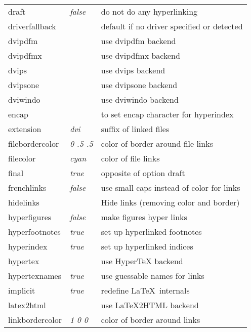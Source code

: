 \documentclass{article}
\begin{document}
\begin{longtable}{@{}>{\ttfamily}llp{7cm}@{}}
draft              & \textit{false}         & do not do any hyperlinking \\
driverfallback     &                        & default if no driver specified or detected\\
dvipdfm            &                        & use \textsf{dvipdfm} backend \\
dvipdfmx           &                        & use \textsf{dvipdfmx} backend \\
dvips              &                        & use \textsf{dvips} backend \\
dvipsone           &                        & use \textsf{dvipsone} backend \\
dviwindo           &                        & use \textsf{dviwindo} backend \\
encap              &                        & to set encap character for hyperindex \\
extension          & \textit{dvi}           & suffix of linked files \\
filebordercolor    & \textit{0 .5 .5}       & color of border around file links \\
filecolor          & \textit{cyan}          & color of file links \\
final              & \textit{true}          & opposite of option draft \\
frenchlinks        & \textit{false}         & use small caps instead of color for links \\
hidelinks          &                        & Hide links (removing color and border) \\
hyperfigures       & \textit{false}         & make figures hyper links \\
hyperfootnotes     & \textit{true}          & set up hyperlinked footnotes \\
hyperindex         & \textit{true}          & set up hyperlinked indices \\
hypertex           &                        & use \textsf{Hyper\TeX} backend \\
hypertexnames      & \textit{true}          & use guessable names for links \\
implicit           & \textit{true}          & redefine \LaTeX\ internals \\
latex2html         &                        & use \textsf{\LaTeX2HTML} backend \\
linkbordercolor    & \textit{1 0 0}         & color of border around links \\

\end{longtable}
\end{document}
